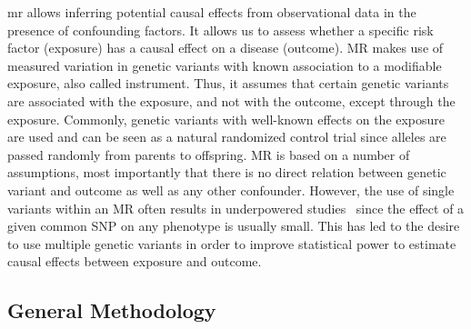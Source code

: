 \acrfull{mr} allows  inferring potential causal effects from observational data in the presence of confounding factors. 
It allows us to assess whether a specific risk factor (exposure) has a causal effect on a disease (outcome).
MR makes use of measured variation in genetic variants with known association to a modifiable exposure, also called instrument.
Thus, it assumes that certain genetic variants are associated with the exposure, and not with the outcome, except through the exposure.
Commonly, genetic variants with well-known effects on the exposure are used and can be seen as a natural randomized control trial since alleles are passed randomly from parents to offspring.
MR is based on a number of assumptions, most importantly that there is no direct relation between genetic variant and outcome as well as any other confounder.
However, the use of single variants within an MR often results in underpowered studies~\cite{Bowden2015} since the effect of a given common SNP on any phenotype is usually small.
This has led to the desire to use multiple genetic variants in order to improve statistical power to estimate causal effects between exposure and outcome.


\subsection{General Methodology}
\label{sub:General_Methedology}

